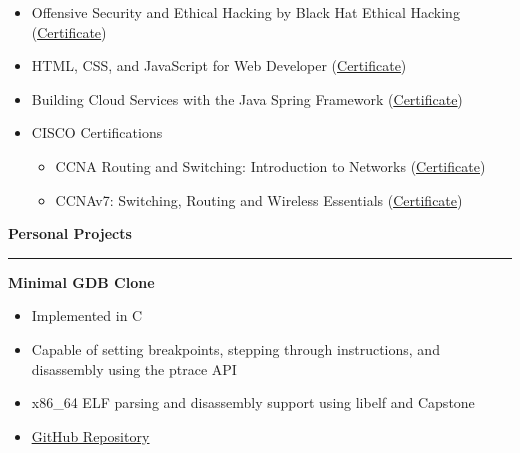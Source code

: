 \documentclass[12pt]{article}
\begin{document}
{\renewcommand{\labelitemi}{\textcolor{bgcolor}{\normalsize$\bullet$}}%
   \begin{itemize}[leftmargin=13pt, itemsep=0pt, topsep=0pt]
      \item Offensive Security and Ethical Hacking by Black Hat Ethical Hacking (\href{https://giorgospaphitis.com/resources/pdfs/Offensive_Security_Ethical_Hacking_Course_Certificate_Giorgos_Paphitis.pdf}{\underline{Certificate}})\\
      \item HTML, CSS, and JavaScript for Web Developer (\href{https://www.coursera.org/account/accomplishments/verify/F7P88FB4ZCZ9?utm_source=ln&utm_medium=certificate&utm_content=cert_image&utm_campaign=sharing_cta&utm_product=course}{\underline{Certificate}})\\
      \item Building Cloud Services with the Java Spring Framework (\href{https://www.coursera.org/account/accomplishments/verify/QMED2F9XQBMH?utm_source=link&utm_medium=certificate&utm_content=cert_image&utm_campaign=sharing_cta&utm_product=course}{\underline{Certificate}})\\
      \item CISCO Certifications\\
      \begin{itemize}[leftmargin=20pt, itemsep=0pt, topsep=-3pt,partopsep=0pt]
         \item CCNA Routing and Switching: Introduction to Networks (\href{https://giorgospaphitis.com/resources/pdfs/Giorgos_Paphitis_CCNA_Intro.pdf}{\underline{Certificate}})\\
         \item CCNAv7: Switching, Routing and Wireless Essentials (\href{https://giorgospaphitis.com/resources/pdfs/Giorgos_Paphitis_CCNA_7.pdf}{\underline{Certificate}})\\
      \end{itemize}
   \end{itemize}
}
\vspace{1cm}
{\fontsize{14pt}{13pt}\selectfont
   \textbf{\textcolor{bgcolor}{Personal Projects}}\\[0.3em]
}
\hrule
\vspace{0.5cm}
\textbf{\textcolor{bgcolor}{Minimal GDB Clone}}\\[0.5em]
{\renewcommand{\labelitemi}{\textcolor{bgcolor}{\normalsize$\bullet$}}%
   \begin{itemize}[leftmargin=33pt, itemsep=0pt, topsep=0pt]
      \item Implemented in C\\
      \item Capable of setting breakpoints, stepping through instructions, and disassembly using the ptrace API\\
      \item x86\_64 ELF parsing and disassembly support using libelf and Capstone\\
      \item \href{https://github.com/gpaphitis/MinimalGDB}{\underline{GitHub Repository}}\\
   \end{itemize}
}
\end{document}
